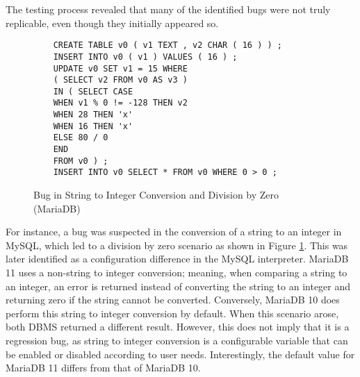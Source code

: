 \documentclass[sigconf]{acmart}
\begin{document}
The testing process revealed that many of the identified bugs were not truly replicable, even though they initially appeared so.
\begin{figure}[h]
    \centering
    \begin{verbatim}
    CREATE TABLE v0 ( v1 TEXT , v2 CHAR ( 16 ) ) ;
    INSERT INTO v0 ( v1 ) VALUES ( 16 ) ;
    UPDATE v0 SET v1 = 15 WHERE
    ( SELECT v2 FROM v0 AS v3 )
    IN ( SELECT CASE
    WHEN v1 % 0 != -128 THEN v2
    WHEN 28 THEN 'x'
    WHEN 16 THEN 'x'
    ELSE 80 / 0
    END
    FROM v0 ) ;
    INSERT INTO v0 SELECT * FROM v0 WHERE 0 > 0 ;
    \end{verbatim}
    \caption{Bug in String to Integer Conversion and Division by Zero (MariaDB)}
    \label{fig:bug_div}
    \end{figure}
For instance, a bug was suspected in the conversion of a string to an integer in MySQL, which led to a division by zero scenario as shown in Figure \ref{fig:bug_div}. This was later identified as a configuration difference in the MySQL interpreter. MariaDB 11 uses a non-string to integer conversion; meaning, when comparing a string to an integer, an error is returned instead of converting the string to an integer and returning zero if the string cannot be converted. Conversely, MariaDB 10 does perform this string to integer conversion by default. When this scenario arose, both DBMS returned a different result. However, this does not imply that it is a regression bug, as string to integer conversion is a configurable variable that can be enabled or disabled according to user needs. Interestingly, the default value for MariaDB 11 differs from that of MariaDB 10.
\end{document}
